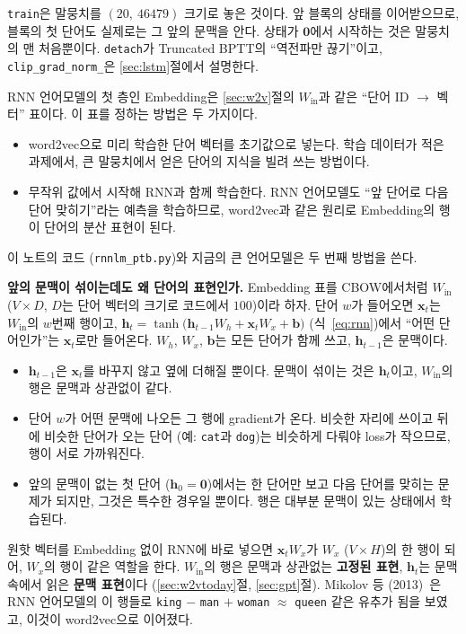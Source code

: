 \documentclass[11pt,a4paper]{article}
\newcommand{\eqnref}[1]{식~\eqref{eq:#1}}
\newcommand{\vect}[1]{\bm{#1}}
\newcommand{\w}[1]{\texttt{#1}}
\begin{document}
\texttt{train}은 말뭉치를 $(20,\ 46479)$ 크기로 놓은 것이다. 앞 블록의 상태를 이어받으므로, 블록의 첫 단어도 실제로는 그 앞의 문맥을 안다. 상태가 $\vect 0$에서 시작하는 것은 말뭉치의 맨 처음뿐이다.
\texttt{detach}가 Truncated BPTT의 ``역전파만 끊기''이고, \texttt{clip\_grad\_norm\_}은 \ref{sec:lstm}절에서 설명한다.

\begin{remarkbox}
RNN 언어모델의 첫 층인 Embedding은 \ref{sec:w2v}절의 $W_{\text{in}}$과 같은 ``단어 ID $\to$ 벡터'' 표이다. 이 표를 정하는 방법은 두 가지이다.
\begin{itemize}[leftmargin=1.2em]
\item word2vec으로 미리 학습한 단어 벡터를 초기값으로 넣는다. 학습 데이터가 적은 과제에서, 큰 말뭉치에서 얻은 단어의 지식을 빌려 쓰는 방법이다.
\item 무작위 값에서 시작해 RNN과 함께 학습한다. RNN 언어모델도 ``앞 단어로 다음 단어 맞히기''라는 예측을 학습하므로, word2vec과 같은 원리로 Embedding의 행이 단어의 분산 표현이 된다.
\end{itemize}
이 노트의 코드 (\texttt{rnnlm\_ptb.py})와 지금의 큰 언어모델은 두 번째 방법을 쓴다.

\medskip
\textbf{앞의 문맥이 섞이는데도 왜 단어의 표현인가.}
Embedding 표를 CBOW에서처럼 $W_{\text{in}}$ ($V\times D$, $D$는 단어 벡터의 크기로 코드에서 $100$)이라 하자. 단어 $w$가 들어오면 $\vect x_t$는 $W_{\text{in}}$의 $w$번째 행이고,
$\vect h_t=\tanh\big(\vect h_{t-1}W_h+\vect x_tW_x+\vect b\big)$ (\eqnref{rnn})에서 ``어떤 단어인가''는 $\vect x_t$로만 들어온다. $W_h$, $W_x$, $\vect b$는 모든 단어가 함께 쓰고, $\vect h_{t-1}$은 문맥이다.
\begin{itemize}[leftmargin=1.2em]
\item $\vect h_{t-1}$은 $\vect x_t$를 바꾸지 않고 옆에 더해질 뿐이다. 문맥이 섞이는 것은 $\vect h_t$이고, $W_{\text{in}}$의 행은 문맥과 상관없이 같다.
\item 단어 $w$가 어떤 문맥에 나오든 그 행에 gradient가 온다. 비슷한 자리에 쓰이고 뒤에 비슷한 단어가 오는 단어 (예: \w{cat}과 \w{dog})는 비슷하게 다뤄야 loss가 작으므로, 행이 서로 가까워진다.
\item 앞의 문맥이 없는 첫 단어 ($\vect h_0=\vect 0$)에서는 한 단어만 보고 다음 단어를 맞히는 문제가 되지만, 그것은 특수한 경우일 뿐이다. 행은 대부분 문맥이 있는 상태에서 학습된다.
\end{itemize}
원핫 벡터를 Embedding 없이 RNN에 바로 넣으면 $\vect x_tW_x$가 $W_x$ ($V\times H$)의 한 행이 되어, $W_x$의 행이 같은 역할을 한다.
$W_{\text{in}}$의 행은 문맥과 상관없는 \textbf{고정된 표현}, $\vect h_t$는 문맥 속에서 읽은 \textbf{문맥 표현}이다 (\ref{sec:w2vtoday}절, \ref{sec:gpt}절).
Mikolov 등 (2013)~\cite{mikolov2013c}은 RNN 언어모델의 이 행들로 \w{king} $-$ \w{man} $+$ \w{woman} $\approx$ \w{queen} 같은 유추가 됨을 보였고, 이것이 word2vec으로 이어졌다.
\end{remarkbox}
\end{document}
